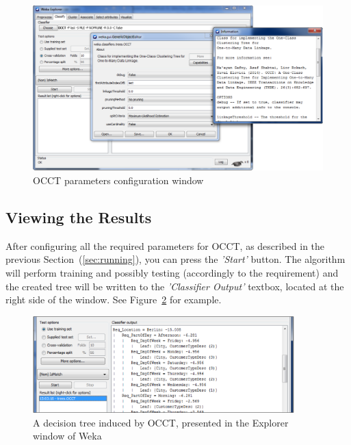 \documentclass[a4paper,12pt]{article}
\begin{document}
\begin{spacing}{1.5}
\begin{figure}[!t]
  \centering
  \includegraphics[width=1\textwidth]{Figures/GUI/PDF/OCCTConfig.pdf}
  \caption{OCCT parameters configuration window}
  \label{fig:occtconf}
\end{figure}

\subsection{Viewing the Results}
After configuring all the required parameters for OCCT, as described in the previous Section~(\ref{sec:running}), you can press the {\em 'Start'} button. The algorithm will perform training and possibly testing (accordingly to the requirement) and the created tree will be written to the {\em 'Classifier Output'} textbox, located at the right side of the window. See Figure~\ref{fig:occtview} for example.

\begin{figure}[!h]
  \centering
  \includegraphics[width=0.9\textwidth]{Figures/GUI/PDF/OCCTViewTree.pdf}
  \caption{A decision tree induced by OCCT, presented in the Explorer window of Weka}
  \label{fig:occtview}
\end{figure}


\end{spacing}
\end{document}
